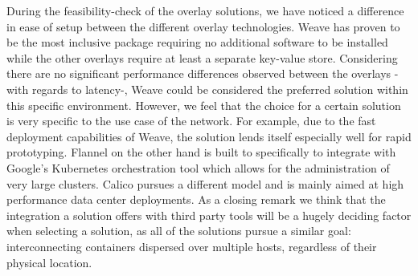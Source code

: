 During the feasibility-check of the overlay solutions, we have noticed a difference in ease of setup between the different overlay technologies. Weave has proven to be the most inclusive package requiring no additional software to be installed while the other overlays require at least a separate key-value store. Considering there are no significant performance differences observed between the overlays -with regards to latency-, Weave could be considered the preferred solution within this specific environment. However, we feel that the choice for a certain solution is very specific to the use case of the network. For example, due to the fast deployment capabilities of Weave, the solution lends itself especially well for rapid prototyping. Flannel on the other hand is built to specifically to integrate with Google's Kubernetes orchestration tool which allows for the administration of very large clusters. Calico pursues a different model and is mainly aimed at high performance data center deployments. As a closing remark we think that the integration a solution offers with third party tools will be a hugely deciding factor when selecting a solution, as all of the solutions pursue a similar goal: interconnecting containers dispersed over multiple hosts, regardless of their physical location. 